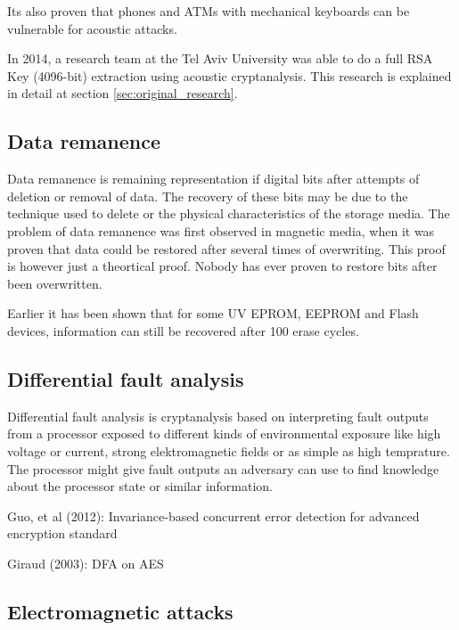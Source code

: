 Its also proven that phones and ATMs with mechanical keyboards can be vulnerable for acoustic attacks\cite{DBLP:conf/sp/AsonovA04}.

In 2014, a research team at the Tel Aviv University was able to do a full RSA Key (4096-bit) extraction using acoustic cryptanalysis. 
This research is explained in detail at section \ref{sec:original_research}.

\subsection{Data remanence}\label{sec:data_remanence}

Data remanence is remaining representation if digital bits after attempts of deletion or removal of data. 
The recovery of these bits may be due to the technique used to delete or the physical characteristics of the storage media. 
The problem of data remanence was first observed in magnetic media, when it was proven that data could be restored after several times of overwriting. 
This proof is however just a theortical proof. 
Nobody has ever proven to restore bits after been overwritten. 

Earlier it has been shown that for some UV EPROM, EEPROM and Flash devices, information can still be recovered after 100 erase cycles\cite{DBLP:conf/ches/Skorobogatov05}.


\subsection{Differential fault analysis}\label{sec:differential_fault_analysis}

Differential fault analysis is cryptanalysis based on interpreting fault outputs from a processor exposed to different kinds of environmental exposure like high voltage or current, strong elektromagnetic fields or as simple as high temprature. 
The processor might give fault outputs an adversary can use to find knowledge about the processor state or similar information.


Guo, et al (2012): Invariance-based concurrent error detection for advanced encryption standard\cite{DBLP:journals/iacr/GuoK13}

Giraud (2003): DFA on AES\cite{DBLP:journals/iacr/Giraud03}

\subsection{Electromagnetic attacks}\label{sec:electromagnetic_attacks}

